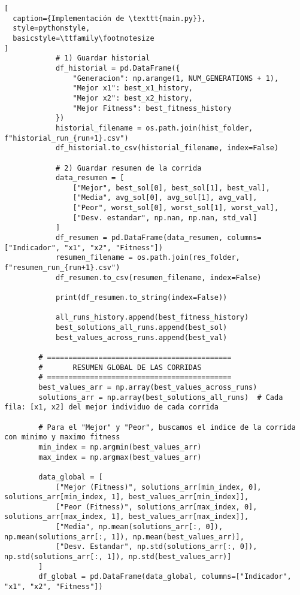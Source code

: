 \begin{lstlisting}[
  caption={Implementación de \texttt{main.py}},
  style=pythonstyle,
  basicstyle=\ttfamily\footnotesize
]
            # 1) Guardar historial
            df_historial = pd.DataFrame({
                "Generacion": np.arange(1, NUM_GENERATIONS + 1),
                "Mejor x1": best_x1_history,
                "Mejor x2": best_x2_history,
                "Mejor Fitness": best_fitness_history
            })
            historial_filename = os.path.join(hist_folder, f"historial_run_{run+1}.csv")
            df_historial.to_csv(historial_filename, index=False)
            
            # 2) Guardar resumen de la corrida
            data_resumen = [
                ["Mejor", best_sol[0], best_sol[1], best_val],
                ["Media", avg_sol[0], avg_sol[1], avg_val],
                ["Peor", worst_sol[0], worst_sol[1], worst_val],
                ["Desv. estandar", np.nan, np.nan, std_val]
            ]
            df_resumen = pd.DataFrame(data_resumen, columns=["Indicador", "x1", "x2", "Fitness"])
            resumen_filename = os.path.join(res_folder, f"resumen_run_{run+1}.csv")
            df_resumen.to_csv(resumen_filename, index=False)
            
            print(df_resumen.to_string(index=False))
            
            all_runs_history.append(best_fitness_history)
            best_solutions_all_runs.append(best_sol)
            best_values_across_runs.append(best_val)
        
        # ===========================================
        #       RESUMEN GLOBAL DE LAS CORRIDAS
        # ===========================================
        best_values_arr = np.array(best_values_across_runs)
        solutions_arr = np.array(best_solutions_all_runs)  # Cada fila: [x1, x2] del mejor individuo de cada corrida
        
        # Para el "Mejor" y "Peor", buscamos el indice de la corrida con minimo y maximo fitness
        min_index = np.argmin(best_values_arr)
        max_index = np.argmax(best_values_arr)
        
        data_global = [
            ["Mejor (Fitness)", solutions_arr[min_index, 0], solutions_arr[min_index, 1], best_values_arr[min_index]],
            ["Peor (Fitness)", solutions_arr[max_index, 0], solutions_arr[max_index, 1], best_values_arr[max_index]],
            ["Media", np.mean(solutions_arr[:, 0]), np.mean(solutions_arr[:, 1]), np.mean(best_values_arr)],
            ["Desv. Estandar", np.std(solutions_arr[:, 0]), np.std(solutions_arr[:, 1]), np.std(best_values_arr)]
        ]
        df_global = pd.DataFrame(data_global, columns=["Indicador", "x1", "x2", "Fitness"])
        

\end{lstlisting}
